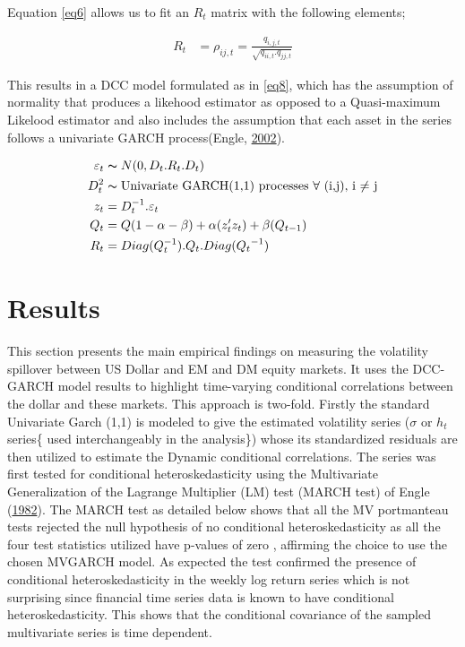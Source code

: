 \documentclass[11pt,preprint, authoryear]{elsarticle}
\numberwithin{equation}{section}
\numberwithin{figure}{section}
\numberwithin{table}{section}
\begin{document}
Equation \ref{eq6} allows us to fit an \(R_t\) matrix with the following
elements;

\begin{align} \label{eq7}
R_t &= \rho_{ij,t} = \frac{q_{i,j,t}}{\sqrt{q_{ii,t}.q_{jj,t}}} 
\end{align}

This results in a DCC model formulated as in \ref{eq8}, which has the
assumption of normality that produces a likehood estimator as opposed to
a Quasi-maximum Likelood estimator and also includes the assumption that
each asset in the series follows a univariate GARCH process(Engle,
\protect\hyperlink{ref-engle2002}{2002}).

\begin{align} \label{eq8}
\varepsilon_t &\thicksim  N(0,D_t.R_t.D_t) \notag \\
D_t^2 &\thicksim \text{Univariate GARCH(1,1) processes $\forall$ (i,j), i $\ne$ j} \notag \\
z_t&=D_t^{-1}.\varepsilon_t \notag \\
Q_t&={Q}(1-\alpha-\beta)+\alpha(z_t'z_t)+\beta(Q_{t-1}) \notag \\
R_t &= Diag(Q_t^{-1}).Q_t.Diag({Q_t}^{-1}) \notag \\
\end{align}

\hypertarget{results}{%
\section{Results}\label{results}}

This section presents the main empirical findings on measuring the
volatility spillover between US Dollar and EM and DM equity markets. It
uses the DCC-GARCH model results to highlight time-varying conditional
correlations between the dollar and these markets. This approach is
two-fold. Firstly the standard Univariate Garch (1,1) is modeled to give
the estimated volatility series (\(\sigma\) or \(h_t\) series\{ used
interchangeably in the analysis\}) whose its standardized residuals are
then utilized to estimate the Dynamic conditional correlations. The
series was first tested for conditional heteroskedasticity using the
Multivariate Generalization of the Lagrange Multiplier (LM) test (MARCH
test) of Engle (\protect\hyperlink{ref-engle1982}{1982}). The MARCH test
as detailed below shows that all the MV portmanteau tests rejected the
null hypothesis of no conditional heteroskedasticity as all the four
test statistics utilized have p-values of zero , affirming the choice to
use the chosen MVGARCH model. As expected the test confirmed the
presence of conditional heteroskedasticity in the weekly log return
series which is not surprising since financial time series data is known
to have conditional heteroskedasticity. This shows that the conditional
covariance of the sampled multivariate series is time dependent.
\end{document}
